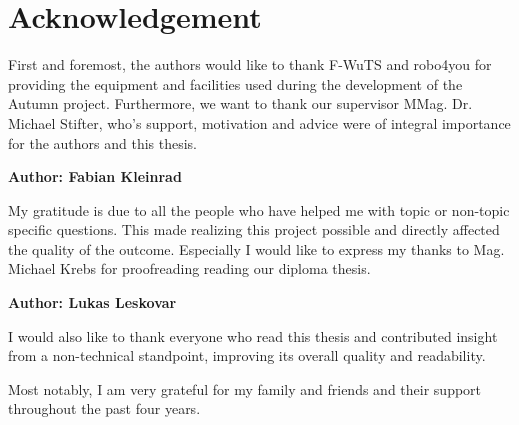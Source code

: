 \chapter{Acknowledgement}

First and foremost, the authors would like to thank F-WuTS and robo4you for providing the equipment and facilities used during the development of the Autumn project. Furthermore, we want to thank our supervisor MMag. Dr. Michael Stifter, who's support, motivation and advice were of integral importance for the authors and this thesis.\linebreak

\textbf{Author: Fabian Kleinrad}

My gratitude is due to all the people who have helped me with topic or non-topic specific questions. This made realizing this project possible and directly affected the quality of the outcome. 
Especially I would like to express my thanks to Mag. Michael Krebs for proofreading reading our diploma thesis.

\textbf{Author: Lukas Leskovar}


I would also like to thank everyone who read this thesis and contributed insight from a non-technical standpoint, improving its overall quality and readability. 

Most notably, I am very grateful for my family and friends and their support throughout the past four years. 
